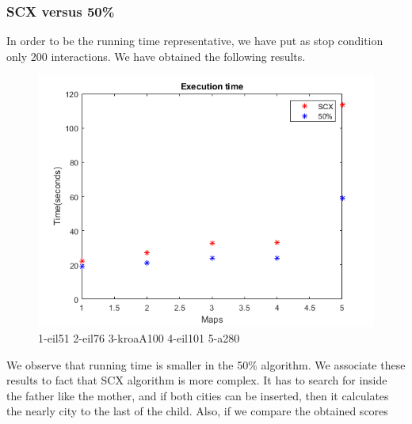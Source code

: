\documentclass{article}
\begin{document}
\subsubsection{SCX versus 50\%} 
In order to be the running time representative, we have put as stop condition only 200 interactions. We have obtained the following results. 
\begin{figure}[H]
    \centering
    \includegraphics[width=1\textwidth]{tiempo.png}
    \caption{1-eil51 2-eil76 3-kroaA100 4-eil101 5-a280}
\end{figure}

We observe that running time is smaller in the 50\% algorithm. We associate these results to fact that SCX algorithm is more complex. 
It has to search for inside the father like the mother, and if both cities can be inserted, then it calculates the nearly city to the last 
of the child. Also, if we compare the obtained scores
\end{document}
